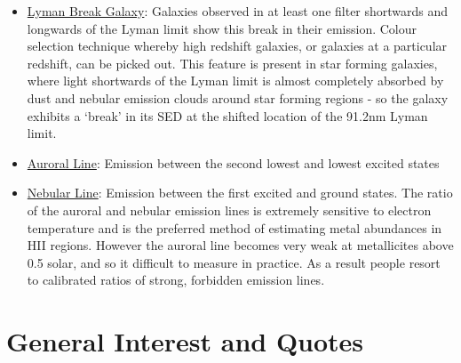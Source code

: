 \documentclass{literature}
\begin{document}
\begin{itemize}
\item \underline{Lyman Break Galaxy}: Galaxies observed in at least one filter shortwards and longwards of the Lyman limit show this break in their emission. Colour selection technique whereby high redshift galaxies, or galaxies at a particular redshift, can be picked out. This feature is present in star forming galaxies, where light shortwards of the Lyman limit is almost completely absorbed by dust and nebular emission clouds around star forming regions - so the galaxy exhibits a `break' in its SED at the shifted location of the 91.2nm Lyman limit.
\item \underline{Auroral Line}: Emission between the second lowest and lowest excited states 
\item \underline{Nebular Line}: Emission between the first excited and ground states. The ratio of the auroral and nebular emission lines is extremely sensitive to electron temperature and is the preferred method of estimating metal abundances in HII regions. However the auroral line becomes very weak at metallicites above 0.5 solar, and so it difficult to measure in practice. As a result people resort to calibrated ratios of strong, forbidden emission lines.  
\end{itemize}




\section{General Interest and Quotes}
\end{document}
